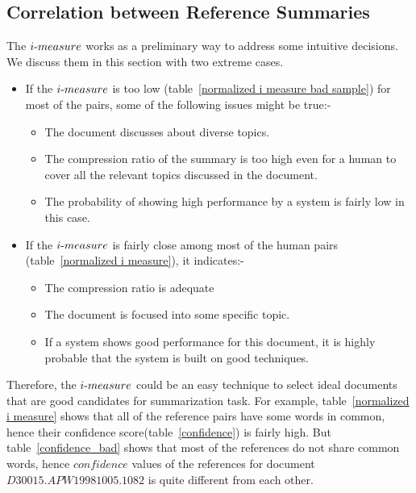 \documentclass[a4paper]{report}
\begin{document}
\subsection{Correlation between Reference Summaries}
\label{refAgreement}
\vspace{-.3cm}
The $i\hbox{-}measure$ works as a preliminary way to address some intuitive decisions. We discuss them in this section with two extreme cases.
 \begin{itemize}
 \item If the $i\hbox{-}measure$ is too low (table~\ref{normalized i measure bad sample}) for most of the pairs, some of the following issues might be true:-
         \begin{itemize}[nolistsep,noitemsep]
        \item The document discusses about diverse topics. 
        \item The compression ratio of the summary is too high even for a human to cover all the relevant topics discussed in the document.
        \item The probability of showing high performance by a system is fairly low in this case.
 \end{itemize}
 \item If the $i\hbox{-}measure$ is fairly close among most of the human pairs (table~\ref{normalized i measure}), it indicates:-
    \begin{itemize}
     \item  The compression ratio is adequate
     \item  The document is focused into some specific topic.
     \item  If a system shows good performance for this document, it is highly probable that the system is built on good techniques. 
   \end{itemize}
 \end{itemize}
Therefore, the $i\hbox{-}measure$ could be an easy technique to select ideal documents that are good candidates for summarization task. For example, table~\ref{normalized i measure} shows that all of the reference pairs have some words in common, hence their confidence score(table~\ref{confidence}) is fairly high. But table~\ref{confidence_bad} shows that most of the references do not share common words, hence $confidence$ values of the references for document $D30015.APW19981005.1082$ is quite different from each other.
\end{document}
